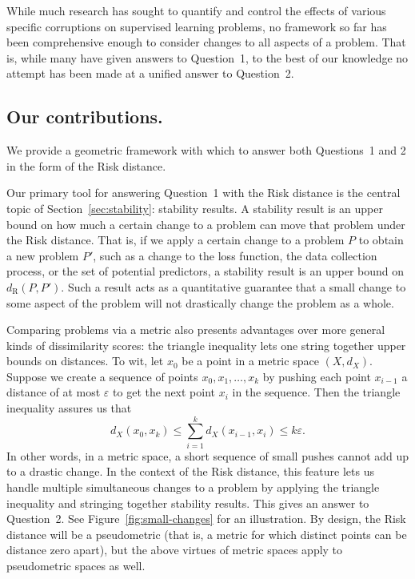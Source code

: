 \documentclass[twoside,11pt]{article}
\newcommand{\dexp}[1][]{d_{\mathrm{R}#1}}
\renewcommand{\epsilon}{\varepsilon}
\begin{document}
While much research has sought to quantify and control the effects of various specific corruptions on supervised learning problems, no framework so far has been comprehensive enough to consider changes to all aspects of a problem. That is, while many have given answers to Question~1, to the best of our knowledge no attempt has been made at a unified answer to Question~2.

\subsection{Our contributions.}
We provide a geometric framework with which to answer both Questions~1 and 2 in the form of the Risk distance.

Our primary tool for answering Question~1 with the Risk distance is the central topic of Section~\ref{sec:stability}: stability results. A stability result is an upper bound on how much a certain change to a problem can move that problem under the Risk distance. That is, if we apply a certain change to a problem $P$ to obtain a new problem $P'$, such as a change to the loss function, the data collection process, or the set of potential predictors, a stability result is an upper bound on $\dexp(P,P')$. Such a result acts as a quantitative guarantee that a small change to some aspect of the problem will not drastically change the problem as a whole.


Comparing problems via a metric also presents advantages over more general kinds of dissimilarity scores: the triangle inequality lets one string together upper bounds on distances.
To wit, let $x_0$ be a point in a metric space $(X,d_X)$. Suppose we create a sequence of points $x_0, x_1, \dots, x_k$ by pushing each point $x_{i-1}$ a distance of at most $\epsilon$ to get the next point $x_i$ in the sequence. Then the triangle inequality assures us that
\[d_X(x_0,x_k)\leq \sum_{i=1}^k d_X(x_{i-1},x_i) \leq k\epsilon.\] 
In other words, in a metric space, a short sequence of small pushes cannot add up to a drastic change. In the context of the Risk distance, this feature lets us handle multiple simultaneous changes to a problem by applying the triangle inequality and stringing together stability results. This gives an answer to Question~2. See Figure~\ref{fig:small-changes} for an illustration. By design, the Risk distance will be a pseudometric (that is, a metric for which distinct points can be distance zero apart), but the above virtues of metric spaces apply to pseudometric spaces as well.
\end{document}
